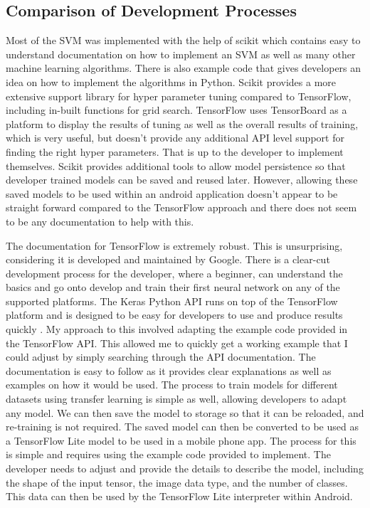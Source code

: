 \documentclass[12pt,a4paper]{report}
\begin{document}
\subsection{Comparison of Development Processes}
Most of the SVM was implemented with the help of scikit which contains easy to understand documentation on how to 
implement an SVM as well as many other machine learning algorithms. There is also example code that gives developers an 
idea on how to implement the algorithms in Python. Scikit provides a more extensive support library for hyper parameter 
tuning compared to TensorFlow, including in-built functions for grid search. TensorFlow uses TensorBoard as a platform 
to display the results of tuning as well as the overall results of training, which is very useful, but doesn't provide 
any additional API level support for finding the right hyper parameters. That is up to the developer to implement 
themselves. Scikit provides additional tools to allow model persistence so that developer trained models can be saved 
and reused later. However, allowing these saved models to be used within an android application doesn't appear to be 
straight forward compared to the TensorFlow approach and there does not seem to be any documentation to help with this. 

\par

The documentation for TensorFlow is extremely robust. This is unsurprising, considering it is developed and maintained 
by Google. There is a clear-cut development process for the developer, where a beginner, can understand the basics and 
go onto develop and train their first neural network on any of the supported platforms. The Keras Python API runs on 
top of the TensorFlow platform and is designed to be easy for developers to use and produce results quickly 
\citep{kerasabout}. My approach to this involved adapting the example code provided in the TensorFlow API. This allowed
me to quickly get a working example that I could adjust by simply searching through the API documentation. The 
documentation is easy to follow as it provides clear explanations as well as examples on how it would be used. The 
process to train models for different datasets using transfer learning is simple as well, allowing developers to adapt 
any model. We can then save the model to storage so that it can be reloaded, and re-training is not required. The saved 
model can then be converted to be used as a TensorFlow Lite model to be used in a mobile phone app. The process for this
is simple and requires using the example code provided to implement. The developer needs to adjust and provide the 
details to describe the model, including the shape of the input tensor, the image data type, and the number of classes. 
This data can then be used by the TensorFlow Lite interpreter within Android.
\end{document}
